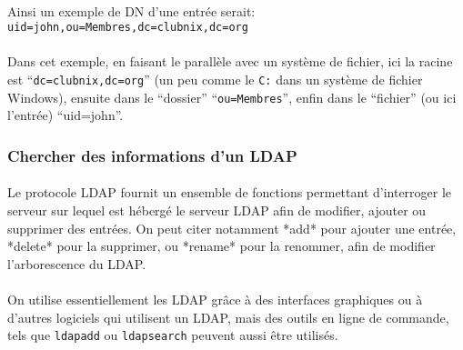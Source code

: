 \paragraph{} Ainsi un exemple de DN d'une entrée serait:
\texttt{uid=john,ou=Membres,dc=clubnix,dc=org}

\paragraph{} Dans cet exemple, en faisant le parallèle avec un système de
fichier, ici la racine est ``\texttt{dc=clubnix,dc=org}'' (un peu comme le
\texttt{C:} dans un système de fichier Windows), ensuite dans le ``dossier''
``\texttt{ou=Membres}'', enfin dans le ``fichier'' (ou ici l'entrée)
``uid=john''.

\subsubsection*{Chercher des informations d'un LDAP}

\paragraph{} Le protocole LDAP fournit un ensemble de fonctions permettant
d'interroger le serveur sur lequel est hébergé le serveur LDAP afin de
modifier, ajouter ou supprimer des entrées. On peut citer notamment *add* pour
ajouter une entrée, *delete* pour la supprimer, ou *rename* pour la renommer,
afin de modifier l'arborescence du LDAP.

\paragraph{} On utilise essentiellement les LDAP grâce à des interfaces
graphiques ou à d'autres logiciels qui utilisent un LDAP, mais des outils en
ligne de commande, tels que \texttt{ldapadd} ou \texttt{ldapsearch} peuvent
aussi être utilisés.
